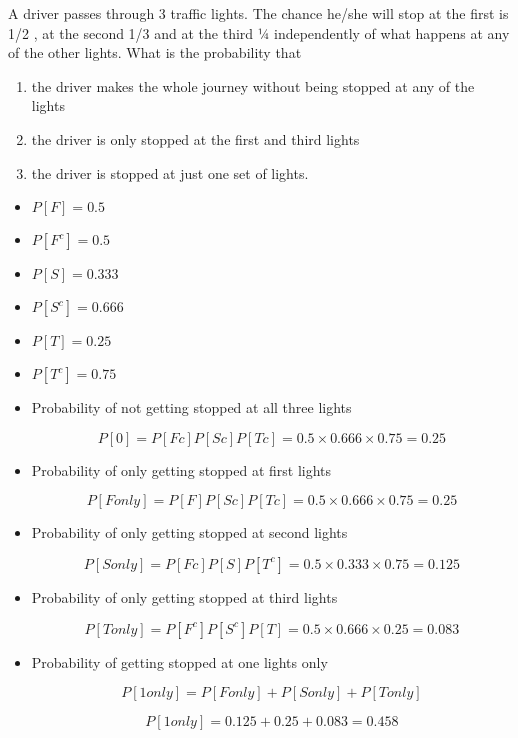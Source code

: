 \item
A driver passes through 3 traffic lights. The chance he/she will stop at the first is 1/2 , at the second 1/3 and at the third ¼ independently of what happens at any of the other lights. What is the probability that

\begin{enumerate}
\item    the driver makes the whole journey without being stopped at any of the lights

\item   the driver is only stopped at the first and third lights

\item  the driver is stopped at just one set of lights.
\end{enumerate}

\begin{framed}
\begin{multicols}{3}
\begin{itemize}
\item $P[F] = 0.5 $  
\item $P[F^c] = 0.5 $           
\item $P[S] = 0.333 $       
\item $P[S^c] = 0.666$
\item $P[T] = 0.25  $      
\item $P[T^c] = 0.75$
\end{itemize}
\end{multicols}


\begin{itemize}
\item Probability of not getting stopped at all three lights


\[P[0] =P[Fc]P[Sc]P[Tc] = 0.5 \times 0.666 \times 0.75 = 0.25\]


\item Probability of only getting stopped at first  lights


\[P[F only] = P[F]P[Sc]P[Tc] = 0.5\times 0.666\times 0.75 = 0.25\]


\item Probability of only getting stopped at second lights


\[P[S only] =P[Fc]P[S]P[T^c] = 0.5\times 0.333\times 0.75 = 0.125\]
\item Probability of only getting stopped at third  lights

\[P[T only] =P[F^c]P[S^c]P[T] = 0.5\times 0.666\times 0.25 = 0.083\]


\item Probability of getting stopped at one lights only 


\[P[1 only] =P[F only]+P[S only]+ P[T only]\]


\[P[1 only] = 0.125 + 0.25 + 0.083 = 0.458\]

\end{itemize}
\end{framed}

